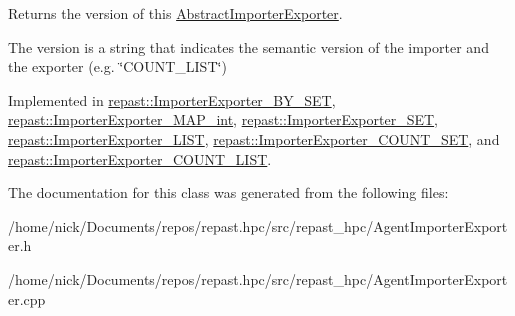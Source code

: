 Returns the version of this \hyperlink{classrepast_1_1_abstract_importer_exporter}{Abstract\-Importer\-Exporter}. 

The version is a string that indicates the semantic version of the importer and the exporter (e.\-g. \char`\"{}\-C\-O\-U\-N\-T\-\_\-\-L\-I\-S\-T\char`\"{}) 

Implemented in \hyperlink{classrepast_1_1_importer_exporter___b_y___s_e_t_a440dc78901d8811ba6046d769df298d9}{repast\-::\-Importer\-Exporter\-\_\-\-B\-Y\-\_\-\-S\-E\-T}, \hyperlink{classrepast_1_1_importer_exporter___m_a_p__int_a801fce0ea8f65aa5b23cc9b1cc9dd818}{repast\-::\-Importer\-Exporter\-\_\-\-M\-A\-P\-\_\-int}, \hyperlink{classrepast_1_1_importer_exporter___s_e_t_a94bcc5a0cb77c6550927663b04410ca2}{repast\-::\-Importer\-Exporter\-\_\-\-S\-E\-T}, \hyperlink{classrepast_1_1_importer_exporter___l_i_s_t_a548c16411acb6e380e9e27139148e294}{repast\-::\-Importer\-Exporter\-\_\-\-L\-I\-S\-T}, \hyperlink{classrepast_1_1_importer_exporter___c_o_u_n_t___s_e_t_a4feec2dc77e01798f1331381198ce3e7}{repast\-::\-Importer\-Exporter\-\_\-\-C\-O\-U\-N\-T\-\_\-\-S\-E\-T}, and \hyperlink{classrepast_1_1_importer_exporter___c_o_u_n_t___l_i_s_t_a576d3dc96aa00bab8a4f0bbe6e64981c}{repast\-::\-Importer\-Exporter\-\_\-\-C\-O\-U\-N\-T\-\_\-\-L\-I\-S\-T}.



The documentation for this class was generated from the following files\-:\begin{DoxyCompactItemize}
\item 
/home/nick/\-Documents/repos/repast.\-hpc/src/repast\-\_\-hpc/Agent\-Importer\-Exporter.\-h\item 
/home/nick/\-Documents/repos/repast.\-hpc/src/repast\-\_\-hpc/Agent\-Importer\-Exporter.\-cpp\end{DoxyCompactItemize}
